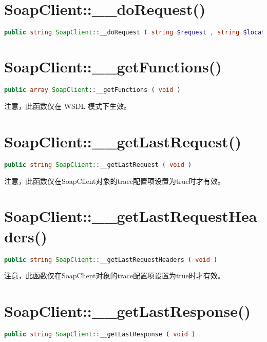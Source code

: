 \section{SoapClient::\_\_doRequest()}

\begin{lstlisting}[language=PHP]
public string SoapClient::__doRequest ( string $request , string $location , string $action , int $version [, int $one_way = 0 ] )
\end{lstlisting}


\section{SoapClient::\_\_getFunctions()}

\begin{lstlisting}[language=PHP]
public array SoapClient::__getFunctions ( void )
\end{lstlisting}

注意，此函数仅在 WSDL 模式下生效。

\section{SoapClient::\_\_getLastRequest()}


\begin{lstlisting}[language=PHP]
public string SoapClient::__getLastRequest ( void )
\end{lstlisting}

注意，此函数仅在SoapClient对象的trace配置项设置为true时才有效。

\section{SoapClient::\_\_getLastRequestHeaders()}

\begin{lstlisting}[language=PHP]
public string SoapClient::__getLastRequestHeaders ( void )
\end{lstlisting}

注意，此函数仅在SoapClient对象的trace配置项设置为true时才有效。

\section{SoapClient::\_\_getLastResponse()}

\begin{lstlisting}[language=PHP]
public string SoapClient::__getLastResponse ( void )
\end{lstlisting}

